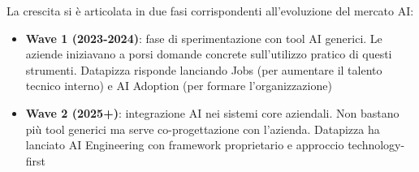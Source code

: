 La crescita si è articolata in due fasi corrispondenti all'evoluzione del mercato AI:
\begin{itemize}
  \item \textbf{Wave 1 (2023-2024)}: fase di sperimentazione con tool 
        AI generici. Le aziende iniziavano a porsi domande concrete 
        sull'utilizzo pratico di questi strumenti. Datapizza risponde 
        lanciando Jobs (per aumentare il talento tecnico interno) e AI 
        Adoption (per formare l'organizzazione)
  
  \item \textbf{Wave 2 (2025+)}: integrazione AI nei sistemi core 
        aziendali. Non bastano più tool generici ma serve co-progettazione 
        con l'azienda. Datapizza ha lanciato AI Engineering con framework 
        proprietario e approccio technology-first
\end{itemize}